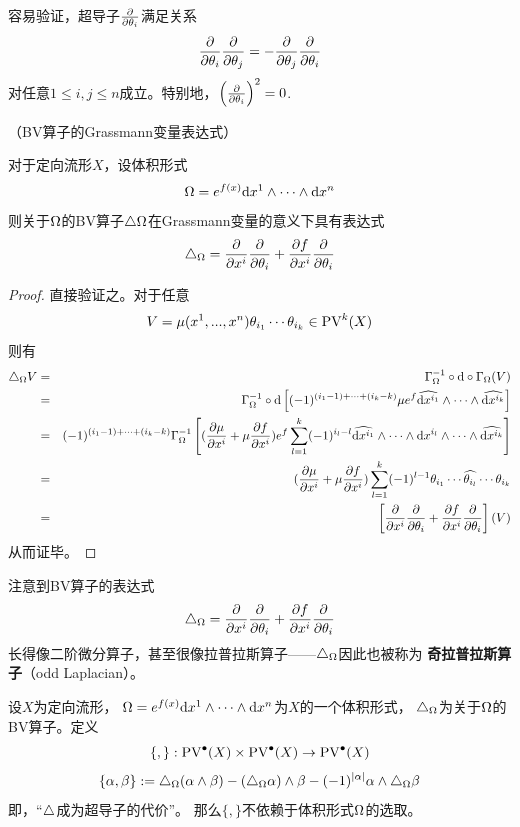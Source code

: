容易验证，超导子$\frac{\partial } {\partial \theta_i}$满足关系
$$\frac{\partial } {\partial \theta_i}\frac{\partial } {\partial \theta_j}=-\frac{\partial } {\partial \theta_j}\frac{\partial } {\partial \theta_i}$$
对任意$1\leq i,j\leq n$成立。特别地，$\left(\frac{\partial } {\partial \theta_i}\right)^2=0$.

\begin{prop}（BV算子的Grassmann变量表达式）

对于定向流形$X$，设体积形式
$$\Omega=e^{f(x)}\mathrm{d} x^1\wedge\cdots\wedge \mathrm{d} x^n$$
则关于$\Omega$的BV算子$\triangle\Omega$在Grassmann变量的意义下具有表达式
$$\triangle_{\Omega}=\frac{\partial } {\partial x^i}\frac{\partial } {\partial \theta_i}+\frac{\partial f} {\partial x^i}\frac{\partial } {\partial \theta_i}$$

\label{BV算子的超变量表达式-prop}
\end{prop}

\begin{proof}
直接验证之。对于任意
$$V=\mu(x^1,...,x^n)\theta_{i_1}\cdots\theta_{i_k}\in\operatorname{PV}^{k}(X)$$
则有
\begin{eqnarray*}
     \triangle_\Omega V
&=&
     \Gamma_\Omega^{-1}\circ\mathrm{d}\circ\Gamma_\Omega(V)\\
&=&
     \Gamma_\Omega^{-1}\circ\mathrm{d}
     \left[
       (-1)^{(i_1-1)+\cdots+(i_k-k)}\mu e^{f}
       \widehat{\mathrm{d} x^{i_1}}\wedge\cdots\wedge\widehat{\mathrm{d} x^{i_k}}
     \right]\\
&=&
     (-1)^{(i_1-1)+\cdots+(i_k-k)}
     \Gamma_\Omega^{-1}
     \left[
       (\frac{\partial \mu} {\partial x^i}+\mu\frac{\partial f} {\partial x^i})e^f
       \sum_{l=1}^k
         (-1)^{i_l-l}
         \widehat{\mathrm{d} x^{i_1}}\wedge\cdots\wedge\mathrm{d} x^{i_l}
         \wedge\cdots\wedge\widehat{\mathrm{d} x^{i_k}}
     \right]\\
&=&
     (\frac{\partial \mu} {\partial x^i}+\mu\frac{\partial f} {\partial x^i})
     \sum_{l=1}^k
       (-1)^{l-1}
       \theta_{i_1}\cdots\widehat{\theta_{i_l}}\cdots \theta_{i_k}\\
&=&
    \left[
      \frac{\partial } {\partial x^i}\frac{\partial } {\partial \theta_i}+\frac{\partial f} {\partial x^i}\frac{\partial } {\partial \theta_i}
    \right](V)
\end{eqnarray*}
从而证毕。
\end{proof}

注意到BV算子的表达式
$$\triangle_{\Omega}=\frac{\partial } {\partial x^i}\frac{\partial } {\partial \theta_i}+\frac{\partial f} {\partial x^i}\frac{\partial } {\partial \theta_i}$$
长得像二阶微分算子，甚至很像拉普拉斯算子——$\triangle_\Omega$因此也被称为
\textbf{奇拉普拉斯算子}（odd Laplacian）。

\begin{prop}设$X$为定向流形，
$\Omega=e^{f(x)}\mathrm{d} x^1\wedge\cdots\wedge\mathrm{d} x^n$为$X$的一个体积形式，
$\triangle_\Omega$为关于$\Omega$的BV算子。定义
$$\{,\}:\operatorname{PV}^{\bullet}(X)\times\operatorname{PV}^{\bullet}(X) \to \operatorname{PV}^{\bullet}(X)$$
$$\{\alpha,\beta\}:=
\triangle_{\Omega}(\alpha\wedge\beta)-(\triangle_{\Omega}\alpha)\wedge\beta-
(-1)^{|\alpha|}\alpha\wedge\triangle_{\Omega}\beta$$
即，“$\triangle$成为超导子的代价”。
那么$\{,\}$不依赖于体积形式$\Omega$的选取。
\label{另一种Schouten-Nijenhuis括号-def}
\end{prop}

